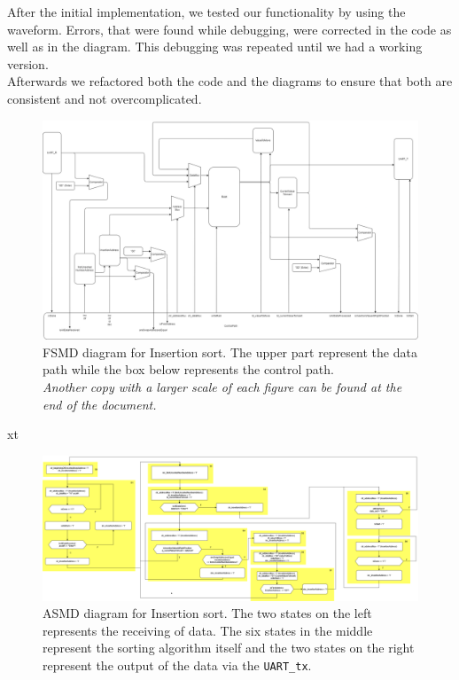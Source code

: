 \documentclass[conference]{IEEEtran}
\begin{document}
After the initial implementation, we tested our functionality by using the waveform. Errors, that were found while debugging, were corrected in the code as well as in the diagram. This debugging was repeated until we had a working version.\\
Afterwards we refactored both the code and the diagrams to ensure that both are consistent and not overcomplicated. 
\begin{figure}
    \centering
    \includegraphics[width=1\linewidth]{Images/FSMDInsertionSort.png}
    \caption{FSMD diagram for Insertion sort. The upper part represent the data path while the box below represents the control path.\\ \textit{Another copy with a larger scale of each figure can be found at the end of the document.}}
    \label{fig:fsmd}
\end{figure}xt
\begin{figure}
    \centering
    \includegraphics[width=1\linewidth]{Images/ASMDInsertionSort.png}
    \caption{ASMD diagram for Insertion sort. The two states on the left represents the receiving of data. The six states in the middle represent the sorting algorithm itself and the two states on the right represent the output of the data via the \texttt{UART\_tx}.}
    \label{fig:asmd}
\end{figure}
\end{document}
